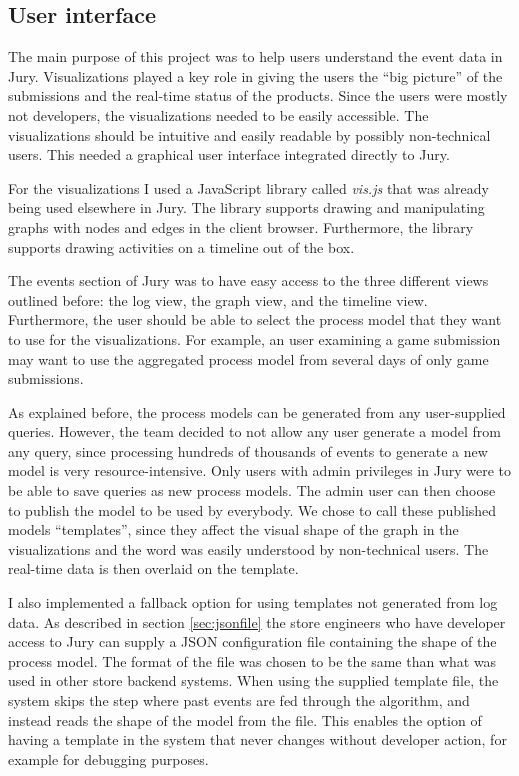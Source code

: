 \subsection{User interface}
\label{sec:userinterface}

The main purpose of this project was to help users understand the event data in Jury.
Visualizations played a key role in giving the users the ``big picture'' of the submissions and the real-time status of the products.
Since the users were mostly not developers, the visualizations needed to be easily accessible.
The visualizations should be intuitive and easily readable by possibly non-technical users.
This needed a graphical user interface integrated directly to Jury.

For the visualizations I used a JavaScript library called \emph{vis.js} \cite{visjs} that was already being used elsewhere in Jury.
The library supports drawing and manipulating graphs with nodes and edges in the client browser.
Furthermore, the library supports drawing activities on a timeline out of the box.

The events section of Jury was to have easy access to the three different views outlined before: the log view, the graph view, and the timeline view. Furthermore, the user should be able to select the process model that they want to use for the visualizations.
For example, an user examining a game submission may want to use the aggregated process model from several days of only game submissions.

As explained before, the process models can be generated from any user-supplied queries.
However, the team decided to not allow any user generate a model from any query, since processing hundreds of thousands of events to generate a new model is very resource-intensive.
Only users with admin privileges in Jury were to be able to save queries as new process models.
The admin user can then choose to publish the model to be used by everybody.
We chose to call these published models ``templates'', since they affect the visual shape of the graph in the visualizations and the word was easily understood by non-technical users.
The real-time data is then overlaid on the template.

I also implemented a fallback option for using templates not generated from log data. As described in section \ref{sec:jsonfile} the store engineers who have developer access to Jury can supply a JSON configuration file containing the shape of the process model. The format of the file was chosen to be the same than what was used in other store backend systems. 
When using the supplied template file, the system skips the step where past events are fed through the algorithm, and instead reads the shape of the model from the file.  
This enables the option of having a template in the system that never changes without developer action, for example for debugging purposes.

